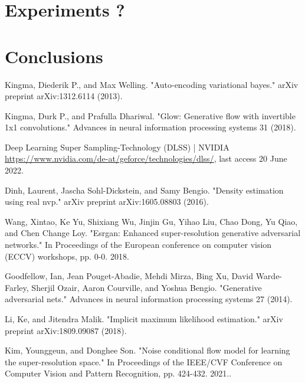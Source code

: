 \documentclass{article}
\begin{document}
\newpage
\section{Experiments ?}\label{sec:eval}
\newpage
\section{Conclusions}\label{sec:conc}


\newpage
\begin{thebibliography}{9}

    Kingma, Diederik P., and Max Welling. "Auto-encoding variational bayes." arXiv preprint arXiv:1312.6114 (2013).

    Kingma, Durk P., and Prafulla Dhariwal. "Glow: Generative flow with invertible 1x1 convolutions." Advances in neural information processing systems 31 (2018).

    Deep Learning Super Sampling-Technology (DLSS) | NVIDIA\\
    \url{https://www.nvidia.com/de-at/geforce/technologies/dlss/}, last access 20 June 2022.
    
    Dinh, Laurent, Jascha Sohl-Dickstein, and Samy Bengio. "Density estimation using real nvp." arXiv preprint arXiv:1605.08803 (2016).

    Wang, Xintao, Ke Yu, Shixiang Wu, Jinjin Gu, Yihao Liu, Chao Dong, Yu Qiao, and Chen Change Loy. "Esrgan: Enhanced super-resolution generative adversarial networks." In Proceedings of the European conference on computer vision (ECCV) workshops, pp. 0-0. 2018.

    Goodfellow, Ian, Jean Pouget-Abadie, Mehdi Mirza, Bing Xu, David Warde-Farley, Sherjil Ozair, Aaron Courville, and Yoshua Bengio. "Generative adversarial nets." Advances in neural information processing systems 27 (2014).

    Li, Ke, and Jitendra Malik. "Implicit maximum likelihood estimation." arXiv preprint arXiv:1809.09087 (2018).

    Kim, Younggeun, and Donghee Son. "Noise conditional flow model for learning the super-resolution space." In Proceedings of the IEEE/CVF Conference on Computer Vision and Pattern Recognition, pp. 424-432. 2021..


\end{thebibliography}
\end{document}

